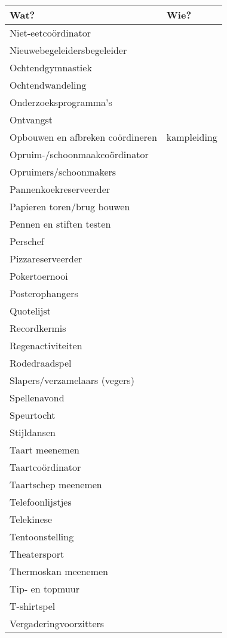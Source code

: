 \documentclass{takenlijst}
\begin{document}
\begin{center}
\begin{small}
\begin{tabular}{|l|l|}
\hline
Wat? & Wie?\\
\hline
\hline
Niet-eetco\"ordinator & \\
\hline
Nieuwebegeleidersbegeleider & \\
\hline
Ochtendgymnastiek & \\
\hline
Ochtendwandeling & \\
\hline
Onderzoeksprogramma's & \\
\hline
Ontvangst & \\
\hline
Opbouwen en afbreken co\"ordineren & kampleiding \\
\hline
Opruim-/schoonmaakco\"ordinator & \\
\hline
Opruimers/schoonmakers & \\
\hline
Pannenkoekreserveerder & \\
\hline
Papieren toren/brug bouwen & \\
\hline
Pennen en stiften testen & \\
\hline
Perschef & \\
\hline
Pizzareserveerder & \\
\hline
Pokertoernooi & \\
\hline
Posterophangers & \\
\hline
Quotelijst & \\
\hline
Recordkermis & \\
\hline
Regenactiviteiten & \\
\hline
Rodedraadspel & \\
\hline
Slapers/verzamelaars (vegers)& \\
\hline
Spellenavond & \\
\hline
Speurtocht & \\
\hline
Stijldansen & \\
\hline
Taart meenemen & \\
\hline
Taartco\"ordinator & \\
\hline
Taartschep meenemen & \\
\hline
Telefoonlijstjes & \\
\hline
Telekinese & \\
\hline
Tentoonstelling & \\
\hline
Theatersport & \\
\hline
Thermoskan meenemen & \\
\hline
Tip- en topmuur & \\
\hline
T-shirtspel & \\
\hline
Vergaderingvoorzitters & \\

\end{tabular}
\end{small}
\end{center}
\end{document}
